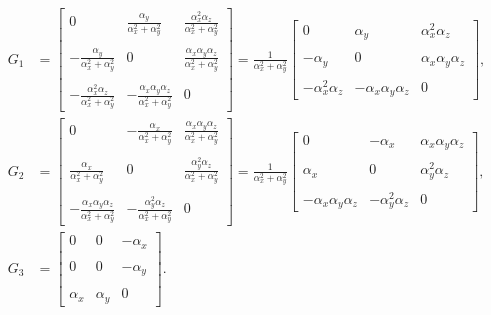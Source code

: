 \documentclass[12pt,nopreprintline]{elsarticle}
\begin{document}
\begin{align*}
   G_1 &= \begin{bmatrix}
 0 & \frac{\alpha_y}{\alpha_x^2 +\alpha_y^2  }&
  \frac{\alpha_x^2 \alpha_z}{\alpha_x^2 +\alpha_y^2  }
  \\
   & &\\
- \frac{\alpha_y}{\alpha_x^2 +\alpha_y^2  }&
 0 &
  \frac{\alpha_x\alpha_y\alpha_z}{\alpha_x^2 +\alpha_y^2 }
  \\
     & &\\
  -\frac{\alpha_x^2 \alpha_z}{\alpha_x^2 +\alpha_y^2} &
  -  \frac{\alpha_x\alpha_y\alpha_z}{\alpha_x^2 +\alpha_y^2 } &
   0
    \end{bmatrix} = \frac{1}{\alpha_x^2 +\alpha_y^2}\begin{bmatrix}
 0 & \alpha_y &
  \alpha_x^2 \alpha_z
  \\
   & &\\
- \alpha_y&
 0 &
  \alpha_x\alpha_y\alpha_z
  \\
     & &\\
  -\alpha_x^2 \alpha_z &
  -  \alpha_x\alpha_y\alpha_z &
   0
    \end{bmatrix},\\
    G_2 &= \begin{bmatrix}
 0 & -\frac{\alpha_x}{\alpha_x^2 +\alpha_y^2  }&
  \frac{\alpha_x\alpha_y \alpha_z}{\alpha_x^2 +\alpha_y^2  }
  \\
   & &\\
 \frac{\alpha_x}{\alpha_x^2 +\alpha_y^2  }&
 0 &
  \frac{\alpha_y^2\alpha_z}{\alpha_x^2 +\alpha_y^2 }
  \\
     & &\\
  -\frac{\alpha_x\alpha_y \alpha_z}{\alpha_x^2 +\alpha_y^2} &
  -  \frac{\alpha_y^2\alpha_z}{\alpha_x^2 +\alpha_y^2 } &
   0
    \end{bmatrix} = \frac{1}{\alpha_x^2 +\alpha_y^2}\begin{bmatrix}
 0 & -\alpha_x &
  \alpha_x \alpha_y \alpha_z
  \\
   & &\\
\alpha_x &
 0 &
  \alpha_y^2 \alpha_z
  \\
     & &\\
  -\alpha_x \alpha_y \alpha_z &
-\alpha_y^2\alpha_z &
   0
    \end{bmatrix},\\   
G_3 & = \begin{bmatrix}
 0&
 0 &
 -\alpha_x
  \\
     & &\\
 0&
 0 &
 -\alpha_y
  \\
     & &\\
  \alpha_x    &\alpha_y & 0 
    \end{bmatrix}.
\end{align*}
\end{document}
